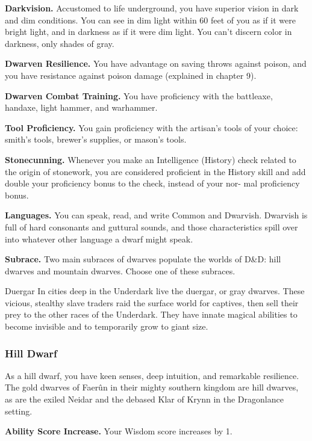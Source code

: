 \textbf{Darkvision.} Accustomed to life underground, you have superior vision in dark and dim conditions. You can see in dim light within 60 feet of you as if it were bright light, and in darkness as if it were dim light. You can’t discern color in darkness, only shades of gray.

\textbf{Dwarven Resilience.} You have advantage on saving throws against poison, and you have resistance against poison damage (explained in chapter 9).

\textbf{Dwarven Combat Training.} You have proficiency with the battleaxe, handaxe, light hammer, and warhammer.

\textbf{Tool Proficiency.} You gain proficiency with the artisan’s tools of your choice: smith’s tools, brewer’s supplies, or mason’s tools.

\textbf{Stonecunning.} Whenever you make an Intelligence (History) check related to the origin of stonework, you are considered proficient in the History skill and add double your proficiency bonus to the check, instead of your nor- mal proficiency bonus.

\textbf{Languages.} You can speak, read, and write Common and Dwarvish. Dwarvish is full of hard consonants and guttural sounds, and those characteristics spill over into whatever other language a dwarf might speak.

\textbf{Subrace.} Two main subraces of dwarves populate the worlds of D\&D: hill dwarves and mountain dwarves. Choose one of these subraces.

\begin{DndSidebar}[float=!t]{Duergar}
In cities deep in the Underdark live the duergar, or gray dwarves. These vicious, stealthy slave traders raid the surface world for captives, then sell their prey to the other races of the Underdark. They have innate magical abilities to become invisible and to temporarily grow to giant size.
\end{DndSidebar}

\subsubsection{Hill Dwarf}
As a hill dwarf, you have keen senses, deep intuition, and remarkable resilience. The gold dwarves of Faerûn in their mighty southern kingdom are hill dwarves, as are the exiled Neidar and the debased Klar of Krynn in the Dragonlance setting.

\textbf{Ability Score Increase.} Your Wisdom score increases by 1.

